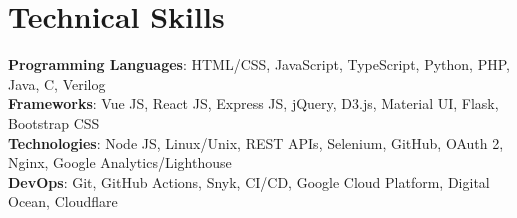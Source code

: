 \section{Technical Skills}
 \begin{itemize}[leftmargin=0.15in, label={}]
    \small{\item{
     \textbf{Programming Languages}{: HTML/CSS, JavaScript, TypeScript, Python, PHP, Java, C, Verilog} \\
     \textbf{Frameworks}{: Vue JS, React JS, Express JS, jQuery, D3.js, Material UI, Flask, Bootstrap CSS } \\
     \textbf{Technologies}{: Node JS, Linux/Unix, REST APIs, Selenium, GitHub, OAuth 2, Nginx, Google Analytics/Lighthouse } \\
     \textbf{DevOps}{: Git, GitHub Actions, Snyk, CI/CD, Google Cloud Platform, Digital Ocean, Cloudflare }
    }}
 \end{itemize} 